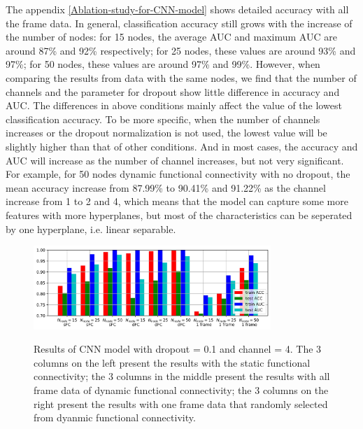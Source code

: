 \documentclass[11pt]{article}
\begin{document}
The appendix \ref{Ablation-study-for-CNN-model} shows detailed accuracy with all the frame data. In general, classification accuracy still grows with the increase of the number of nodes: for 15 nodes, the average AUC and maximum AUC are around 87\% and 92\% respectively; for 25 nodes, these values are around 93\% and 97\%; for 50 nodes, these values are around 97\% and 99\%. However, when comparing the results from data with the same nodes, we find that the number of channels and the parameter for dropout show little difference in accuracy and AUC. The differences in above conditions mainly affect the value of the lowest classification accuracy. To be more specific, when the number of channels increases or the dropout normalization is not used, the lowest value will be slightly higher than that of other conditions. And in most cases, the accuracy and AUC will increase as the number of channel increases, but not very significant. For example, for 50 nodes dynamic functional connectivity with no dropout, the mean accuracy increase from 87.99\% to 90.41\% and 91.22\% as the channel increase from 1 to 2 and 4, which means that the model can capture some more features with more hyperplanes, but most of the characteristics can be seperated by one hyperplane, i.e. linear separable.

\begin{figure}[H]
    \centering
    \includegraphics[width=0.8\textwidth]{../Result/bar_channel=4_dropout=0.1.jpg} \\
    \caption{Results of CNN model with dropout = 0.1 and channel = 4. The 3 columns on the left present the results with the static functional connectivity; the 3 columns in the middle present the results with all frame data of dynamic functional connectivity; the 3 columns on the right present the results with one frame data that randomly selected from dyanmic functional connectivity.}
    \label{CNN-results}
\end{figure}
\end{document}
